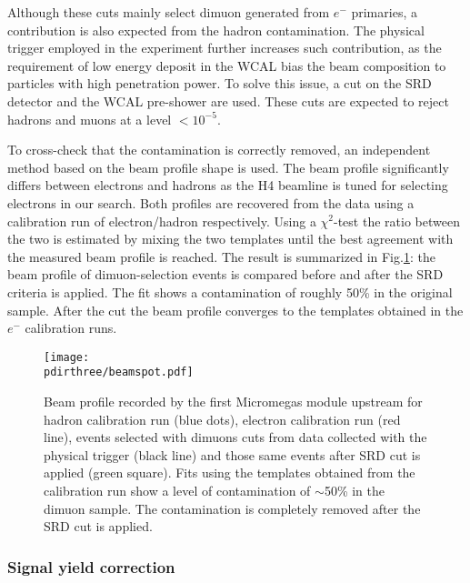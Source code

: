 Although these cuts mainly select dimuon generated from $e^-$ primaries, a contribution is also expected from the hadron contamination. The physical trigger employed in the experiment further increases such contribution, as the requirement of low energy deposit in the WCAL bias the beam composition to particles with high penetration power. To solve this issue, a cut on the SRD detector and the WCAL pre-shower are used. These cuts are expected to reject hadrons and muons at a level $<10^{-5}$.

To cross-check that the contamination is correctly removed, an independent method based on the beam profile shape is used. The beam profile significantly differs between electrons and hadrons as the H4 beamline is tuned for selecting electrons in our search. Both profiles are recovered from the data using a calibration run of electron/hadron respectively. Using a  $\chi^2$-test the ratio between the two is estimated by mixing the two templates until the best agreement with the measured beam profile is reached. The result is summarized in Fig.\ref{fig:dimuon:profile}: the beam profile of dimuon-selection events is compared before and after the SRD criteria is applied. The fit shows a contamination of roughly 50\% in the original sample. After the cut the beam profile converges to the templates obtained in the $e^-$ calibration runs.

\begin{figure}[tbh!]
  \begin{center}
    \texttt{[image: \\pdirthree/beamspot.pdf]}
  \end{center}
  \caption[Beam profile with different cuts]{Beam profile recorded by the first Micromegas module upstream for hadron calibration run (blue dots), electron calibration run (red line), events selected with dimuons cuts from data collected with the physical trigger (black line) and those same events after SRD cut is applied (green square). Fits using the templates obtained from the calibration run show a level of contamination of $\sim$50\% in the dimuon sample. The contamination is completely removed after the SRD cut is applied.}
  \label{fig:dimuon:profile}
\end{figure}


\subsubsection{Signal yield correction}
\label{ch3:sec:dimuons-sig-corr}

